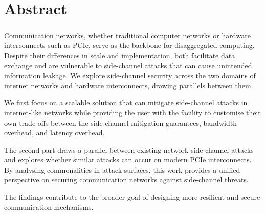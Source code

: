 
\chapter{Abstract}

\paragraph{} Communication networks, whether traditional computer networks or hardware interconnects such as PCIe, serve as the backbone for disaggregated computing. 
Despite their differences in scale and implementation, both facilitate data exchange and are vulnerable to side-channel attacks that can cause unintended information leakage. 
We explore side-channel security across the two domains of internet networks and hardware interconnects, drawing parallels between them. 

We first focus on a scalable solution that can mitigate side-channel attacks in internet-like networks while providing the user with the facility to customise their own trade-offs between the side-channel mitigation guarantees, bandwidth overhead, and latency overhead.

The second part draws a parallel between existing network side-channel attacks and explores whether similar attacks can occur on modern PCIe interconnects.
By analysing commonalities in attack surfaces, this work provides a unified perspective on securing communication networks against side-channel threats.

The findings contribute to the broader goal of designing more resilient and secure communication mechanisms.

\begin{comment}

The first part of this research focuses on mitigating side-channel attacks in traditional networks, proposing defences that minimise information leakage while preserving performance. 

The second part examines interconnects like PCIe, identifying side-channel vulnerabilities and developing detection mechanisms. 

\end{comment}

